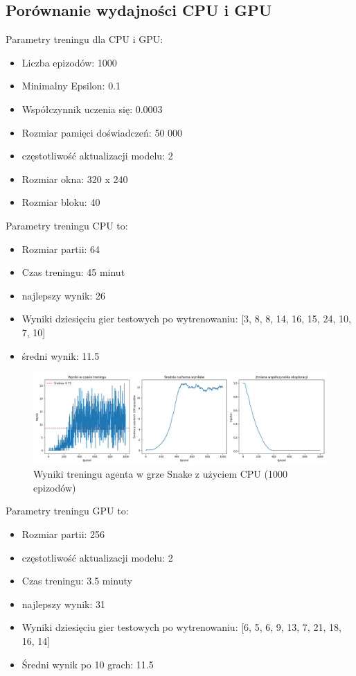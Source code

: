 \documentclass[a4paper,12pt]{article}
\begin{document}
\clearpage
  \subsection{Porównanie wydajności CPU i GPU} 
  Parametry treningu dla CPU i GPU:
  \begin{itemize}
    \item Liczba epizodów: 1000
    \item Minimalny Epsilon: 0.1
    \item Współczynnik uczenia się: 0.0003
    \item Rozmiar pamięci doświadczeń: 50 000
    \item częstotliwość aktualizacji modelu: 2
    \item Rozmiar okna: 320 x 240
    \item Rozmiar bloku: 40
\end{itemize}

  Parametry treningu CPU to:
    \begin{itemize}
        \item Rozmiar partii: 64
        \item Czas treningu: 45 minut
        \item najlepszy wynik: 26
        \item Wyniki dziesięciu gier testowych po wytrenowaniu: [3, 8, 8, 14, 16, 15, 24, 10, 7, 10]
        \item średni wynik: 11.5
        \end{itemize}

  \begin{figure}[H]
    \centering
    \includegraphics[width=1\linewidth]{1000gierCPU.png}
    \caption{Wyniki treningu agenta w grze Snake z użyciem CPU (1000 epizodów)}
    \label{fig:wyniki_treningu_cpu}
\end{figure}
 Parametry treningu GPU to:
\begin{itemize}
    \item Rozmiar partii: 256
    \item częstotliwość aktualizacji modelu: 2
    \item Czas treningu: 3.5 minuty
    \item najlepszy wynik: 31
    \item Wyniki dziesięciu gier testowych po wytrenowaniu: [6, 5, 6, 9, 13, 7, 21, 18, 16, 14]
    \item Średni wynik po 10 grach: 11.5
\end{itemize}
\end{document}

